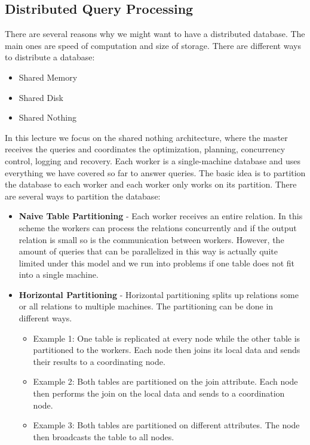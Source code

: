 \subsection{Distributed Query Processing}
There are several reasons why we might want to have a distributed database. The main ones are speed of computation and size of storage. There are different ways to distribute a database:
\begin{itemize}
\item Shared Memory
\item Shared Disk
\item Shared Nothing
\end{itemize}
In this lecture we focus on the shared nothing architecture, where the master receives the queries and coordinates the optimization, planning, concurrency control, logging and recovery. Each worker is a single-machine database and uses everything we have covered so far to answer queries. The basic idea is to partition the database to each worker and each worker only works on its partition. There are several ways to partition the database:
\begin{itemize}
\item \textbf{Naive Table Partitioning} - Each worker receives an entire relation. In this scheme the workers can process the relations concurrently and if the output relation is small so is the communication between workers. However, the amount of queries that can be parallelized in this way is actually quite limited under this model and we run into problems if one table does not fit into a single machine.
\item \textbf{Horizontal Partitioning} - Horizontal partitioning splits up relations some or all relations to multiple machines. The partitioning can be done in different ways.
\begin{itemize}
\item Example 1: One table is replicated at every node while the other table is partitioned to the workers. Each node then joins its local data and sends their results to a coordinating node.
\item Example 2: Both tables are partitioned on the join attribute. Each node then performs the join on the local data and sends to a coordination node.
\item Example 3: Both tables are partitioned on different attributes. The node then broadcasts the table to all nodes.
\end{itemize}
\end{itemize}
